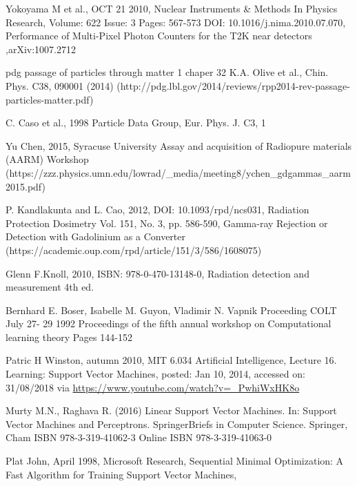 \documentclass[12pt,a4paper]{article}
\begin{document}
\begin{thebibliography}{9}
Yokoyama M et al., OCT 21 2010, Nuclear Instruments \& Methods In Physics Research, Volume: 622  Issue: 3  Pages: 567-573 DOI: 10.1016/j.nima.2010.07.070, Performance of Multi-Pixel Photon Counters for the T2K near detectors ,arXiv:1007.2712

pdg passage of particles through matter 1 chaper 32  K.A. Olive et al., Chin. Phys. C38, 090001 (2014) (http://pdg.lbl.gov/2014/reviews/rpp2014-rev-passage-particles-matter.pdf)

C. Caso et al., 1998 Particle Data Group, Eur. Phys. J. C3, 1 

Yu Chen, 2015, Syracuse University Assay and acquisition of Radiopure materials (AARM) Workshop (https://zzz.physics.umn.edu/lowrad/\_media/meeting8/ychen\_gdgammas\_aarm2015.pdf)

P. Kandlakunta and L. Cao, 2012, DOI: 10.1093/rpd/ncs031, Radiation Protection Dosimetry  Vol. 151, No. 3, pp. 586-590, Gamma-ray Rejection or Detection with Gadolinium as a Converter (https://academic.oup.com/rpd/article/151/3/586/1608075)

Glenn F.Knoll, 2010, ISBN: 978-0-470-13148-0, Radiation detection and measurement 4th ed.  


Bernhard E. Boser, Isabelle M. Guyon, Vladimir N. Vapnik Proceeding COLT July 27- 29 1992 Proceedings of the fifth annual workshop on Computational learning theory Pages 144-152 %

Patric H Winston, autumn 2010, MIT 6.034 Artificial Intelligence, Lecture 16. Learning: Support Vector Machines, posted:  Jan 10, 2014, accessed on: 31/08/2018 via \url{https://www.youtube.com/watch?v=_PwhiWxHK8o}

Murty M.N., Raghava R. (2016) Linear Support Vector Machines. In: Support Vector Machines and Perceptrons. SpringerBriefs in Computer Science. Springer, Cham ISBN 978-3-319-41062-3 Online ISBN 978-3-319-41063-0 

Plat John, April 1998, Microsoft Research, Sequential Minimal Optimization:  A Fast Algorithm for Training Support Vector Machines, %


\end{thebibliography}
\end{document}
